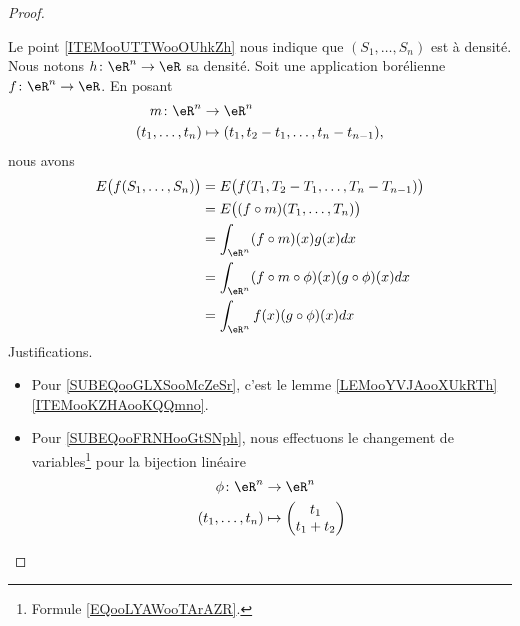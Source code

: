 \begin{proof}
\begin{subproof}
		Le point \ref{ITEMooUTTWooOUhkZh} nous indique que \( (S_1,\ldots, S_n)\) est à densité. Nous notons \( h\colon \eR^n\to \eR\) sa densité. Soit une application borélienne \( f\colon \eR^n\to \eR\). En posant
		\begin{equation}
			\begin{aligned}
				m\colon \eR^n     & \to \eR^n                                   \\
				(t_1,\ldots, t_n) & \mapsto (t_1, t_2-t_1,\ldots, t_n-t_{n-1}),
			\end{aligned}
		\end{equation}
		nous avons
		\begin{subequations}
			\begin{align}
				E\big( f(S_1,\ldots, S_n) \big) & =E\big( f(T_1,T_2-T_1,\ldots, T_n-T_{n-1}) \big)                                       \\
				                                & =E\big( (f\circ m)(T_1,\ldots, T_n) \big)                                              \\
				                                & =\int_{\eR^n}(f\circ m)(x)g(x)dx       \label{SUBEQooGLXSooMcZeSr}                     \\
				                                & =\int_{\eR^n}(f\circ m\circ \phi)(x)(g\circ \phi)(x)dx     \label{SUBEQooFRNHooGtSNph} \\
				                                & =\int_{\eR^n}f(x)(g\circ \phi)(x)dx        \label{SUBEQooETUFooIYIOOO}                 \\
			\end{align}
		\end{subequations}
		Justifications.
		\begin{itemize}
			\item Pour \eqref{SUBEQooGLXSooMcZeSr}, c'est le lemme \ref{LEMooYVJAooXUkRTh}\ref{ITEMooKZHAooKQQmno}.
			\item Pour \eqref{SUBEQooFRNHooGtSNph}, nous effectuons le changement de variables\footnote{Formule \eqref{EQooLYAWooTArAZR}.} pour la bijection linéaire
			      \begin{equation}
				      \begin{aligned}
					      \phi\colon \eR^n  & \to \eR^n              \\
					      (t_1,\ldots, t_n) & \mapsto \begin{pmatrix}
						                                  t_1     \\
						                                  t_1+t_2 \\

\end{pmatrix}
\end{aligned}
\end{equation}
\end{itemize}
\end{subproof}
\end{proof}
